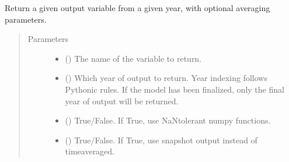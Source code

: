\documentclass[letterpaper,10pt,english]{sphinxmanual}
\begin{document}
\begin{fulllineitems}
\begin{fulllineitems}
\end{fulllineitems}


\begin{fulllineitems}
\label{\detokenize{source/exoplasim:exoplasim.Model.inspect}}
Return a given output variable from a given year, with optional averaging parameters.
\begin{quote}\begin{description}
\item[{Parameters}] \leavevmode\begin{itemize}
\item {} 
 () \textendash{} The name of the variable to return.

\item {} 
 (\sphinxstyleliteralemphasis{\sphinxupquote{, }}) \textendash{} Which year of output to return. Year indexing follows Pythonic rules. If the model
has been finalized, only the final year of output will be returned.

\item {} 
 (\sphinxstyleliteralemphasis{\sphinxupquote{, }}) \textendash{} True/False. If True, use NaN\sphinxhyphen{}tolerant numpy functions.

\item {} 
 (\sphinxstyleliteralemphasis{\sphinxupquote{, }}) \textendash{} True/False. If True, use snapshot output instead of time\sphinxhyphen{}averaged.


\end{itemize}
\end{description}
\end{quote}
\end{fulllineitems}
\end{fulllineitems}
\end{document}
